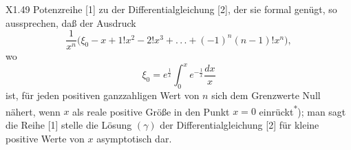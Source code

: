 \par\smallskip\noindent X1.\hfill49
\clearpage{}
\noindent Potenzreihe [1] zu der Differentialgleichung [2], der sie formal genügt, so aussprechen, daß der Ausdruck
\[
\frac1{x^n}\bigl(\xi_0-x+1!x^2-2!x^3+{.}\,{.}\,{.}+(-1)^n(n-1)!x^n\bigr),
\]
\noindent wo
\begin{equation}
\xi_0=e^{\frac1x}\int_0^x e^{-\frac1x}\frac{dx}{x}\tag*{(\(\gamma\))}
\end{equation}
\noindent ist, für jeden positiven ganzzahligen Wert von \(n\) sich dem Grenzwerte Null nähert, wenn \(x\) als reale positive Größe in den Punkt \(x=0\) einrückt\textsuperscript{*}); man sagt die Reihe [1] stelle die Lösung \((\gamma)\) der Differentialgleichung [2] für kleine positive Werte von \(x\) asymptotisch dar.

